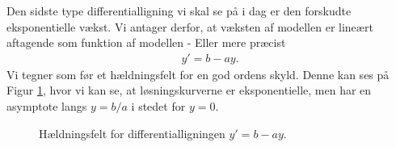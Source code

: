 Den sidste type differentialligning vi skal se på i dag er den forskudte eksponentielle vækst. Vi antager derfor, at væksten af modellen er lineært aftagende som funktion af modellen - Eller mere præcist
\begin{align*}
y' = b-ay.
\end{align*}
Vi tegner som før et hældningsfelt for en god ordens skyld. Denne kan ses på Figur \ref{fig:ekspforskudthæld}, hvor vi kan se, at løsningskurverne er eksponentielle, men har en asymptote langs $y = b/a$ i stedet for $y = 0$.  
\begin{figure}[H]
	\centering
	\caption{Hældningsfelt for differentialligningen $y' = b- ay$.}
	\label{fig:ekspforskudthæld}
\end{figure}

